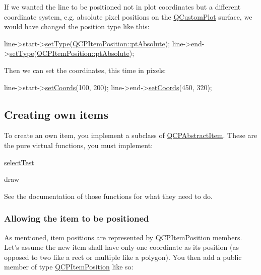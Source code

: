  If we wanted the line to be positioned not in plot coordinates but a different coordinate system, e.\-g. absolute pixel positions on the \hyperlink{classQCustomPlot}{Q\-Custom\-Plot} surface, we would have changed the position type like this\-: 
\begin{DoxyCode}
line->start->\hyperlink{classQCPItemPosition_aa476abf71ed8fa4c537457ebb1a754ad}{setType}(\hyperlink{classQCPItemPosition_aad9936c22bf43e3d358552f6e86dbdc8a564f5e53e550ead1ec5fc7fc7d0b73e0}{QCPItemPosition::ptAbsolute});
line->end->\hyperlink{classQCPItemPosition_aa476abf71ed8fa4c537457ebb1a754ad}{setType}(\hyperlink{classQCPItemPosition_aad9936c22bf43e3d358552f6e86dbdc8a564f5e53e550ead1ec5fc7fc7d0b73e0}{QCPItemPosition::ptAbsolute});
\end{DoxyCode}
 Then we can set the coordinates, this time in pixels\-: 
\begin{DoxyCode}
line->start->\hyperlink{classQCPItemPosition_aa988ba4e87ab684c9021017dcaba945f}{setCoords}(100, 200);
line->end->\hyperlink{classQCPItemPosition_aa988ba4e87ab684c9021017dcaba945f}{setCoords}(450, 320);
\end{DoxyCode}
\hypertarget{classQCPAbstractItem_items-subclassing}{}\subsection{Creating own items}\label{classQCPAbstractItem_items-subclassing}
To create an own item, you implement a subclass of \hyperlink{classQCPAbstractItem}{Q\-C\-P\-Abstract\-Item}. These are the pure virtual functions, you must implement\-: \begin{DoxyItemize}
\item \hyperlink{classQCPAbstractItem_a2e19e88f67f4ba9c13b7e33bd447c075}{select\-Test} \item draw\end{DoxyItemize}
See the documentation of those functions for what they need to do.\hypertarget{classQCPAbstractItem_items-positioning}{}\subsubsection{Allowing the item to be positioned}\label{classQCPAbstractItem_items-positioning}
As mentioned, item positions are represented by \hyperlink{classQCPItemPosition}{Q\-C\-P\-Item\-Position} members. Let's assume the new item shall have only one coordinate as its position (as opposed to two like a rect or multiple like a polygon). You then add a public member of type \hyperlink{classQCPItemPosition}{Q\-C\-P\-Item\-Position} like so\-:


